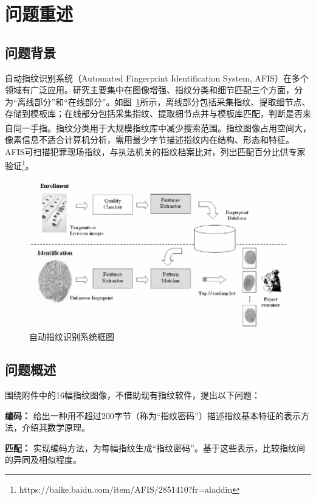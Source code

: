 \documentclass{whutmod}
\newcommand{\upcite}[1]{\textsuperscript{\cite{#1}}}
\begin{document}
    \section{问题重述}
        \subsection{问题背景}
            自动指纹识别系统（Automated Fingerprint Identification System, AFIS）在多个领域有广泛应用。研究主要集中在图像增强、指纹分类和细节匹配三个方面，分为“离线部分”和“在线部分”。如图~\ref{lssct}所示，离线部分包括采集指纹、提取细节点、存储到模板库；在线部分包括采集指纹、提取细节点并与模板库匹配，判断是否来自同一手指\upcite{1,3}。指纹分类用于大规模指纹库中减少搜索范围。指纹图像占用空间大，像素信息不适合计算机分析，需用最少字节描述指纹内在结构、形态和特征。AFIS可扫描犯罪现场指纹，与执法机关的指纹档案比对，列出匹配百分比供专家验证\upcite{2}\footnote{https://baike.baidu.com/item/AFIS/2851410?fr=aladdin}。

            \begin{figure}[H]
                \centering
                \includegraphics[width=.8\textwidth]{figures/AFIS.png}
                \caption{自动指纹识别系统框图}\label{lssct}
            \end{figure}

        \subsection{问题概述}
            围绕附件中的16幅指纹图像，不借助现有指纹软件，提出以下问题：

            \textbf{编码：} 给出一种用不超过200字节（称为“指纹密码”）描述指纹基本特征的表示方法，介绍其数学原理。

            \textbf{匹配：} 实现编码方法，为每幅指纹生成“指纹密码”。基于这些表示，比较指纹间的异同及相似程度。
\end{document}
